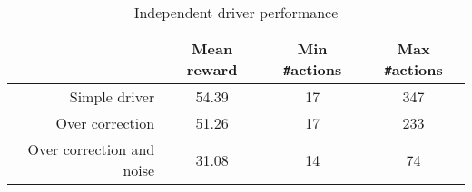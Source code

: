 \begin{table}[htbp]
\footnotesize
\centering
\begin{tabular}{@{}rccc@{}}
\toprule
                            & Mean reward & Min \texttt{\#}actions & Max \texttt{\#}actions \\ \midrule
Simple driver               & 54.39       & 17                     & 347                    \\
Over correction             & 51.26       & 17                     & 233                    \\
Over correction and noise   & 31.08       & 14                     & 74                     \\ \bottomrule
\end{tabular}
\caption{Independent driver performance}
\label{tab:driver_performance}
\end{table}